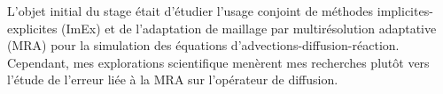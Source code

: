 L'objet initial du stage était d'étudier l'usage conjoint de méthodes implicites-explicites (ImEx) et de l'adaptation de maillage par 
multirésolution adaptative (MRA) pour la simulation des équations d'advections-diffusion-réaction.
Cependant, mes explorations scientifique menèrent mes recherches plutôt vers l'étude de l'erreur liée à la MRA sur l'opérateur de diffusion.   
